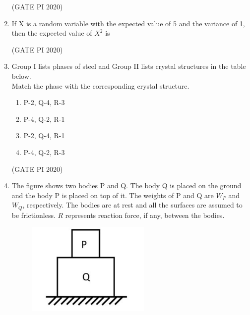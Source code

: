 \documentclass[journal,12pt,onecolumn]{IEEEtran}
\theoremstyle{remark}
\begin{document}
\begin{enumerate}
\hfill (GATE PI 2020)

\item If X is a random variable with the expected value of 5 and the variance of 1, then the expected value of $X^2$ is
\begin{enumerate}
\end{enumerate}

\hfill (GATE PI 2020)

\item Group I lists phases of steel and Group II lists crystal structures in the table below. \\




Match the phase with the corresponding crystal structure.
\begin{enumerate}
    \item P-2, Q-4, R-3
    \item P-4, Q-2, R-1
    \item P-2, Q-4, R-1
    \item P-4, Q-2, R-3
\end{enumerate}

\hfill (GATE PI 2020)

\item The figure shows two bodies P and Q. The body Q is placed on the ground and the body P is placed on top of it. The weights of P and Q are $W_P$ and $W_Q$, respectively. The bodies are at rest and all the surfaces are assumed to be frictionless. $R$ represents reaction force, if any, between the bodies.

\begin{figure}[h]
    \centering
    \includegraphics[width=0.5\columnwidth]{figs/fig5.png}
    \caption{}
    \label{fig:placeholder}
\end{figure}



\end{enumerate}
\end{document}
